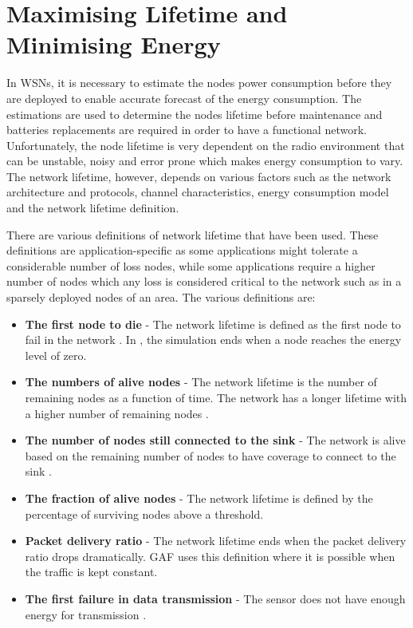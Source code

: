 
\section{Maximising Lifetime and Minimising Energy}
In WSNs, it is necessary to estimate the nodes power consumption before they are deployed to enable accurate forecast of the energy consumption. The estimations are used to determine the nodes lifetime before maintenance and batteries replacements are required in order to have a functional network. Unfortunately, the node lifetime is very dependent on the radio environment that can be unstable, noisy and error prone which makes energy consumption to vary. The network lifetime, however, depends on various factors such as the network architecture and protocols, channel characteristics, energy consumption model and the network lifetime definition. 

There are various definitions of network lifetime that have been used. These definitions are application-specific as some applications might tolerate a considerable number of loss nodes, while some applications require a higher number of nodes which any loss is considered critical to the network such as in a sparsely deployed nodes of an area. The various definitions are:

\begin{itemize}
\item \textbf{The first node to die} - The network lifetime is defined as the first node to fail in the network \cite{maxmin}. In \cite{lifetimedef1}, the simulation ends when a node reaches the energy level of zero.

\item \textbf{The numbers of alive nodes} - The network lifetime is the number of remaining nodes as a function of time. The network has a longer lifetime with a higher number of remaining nodes \cite{lifetimedef2, smecn}.

\item \textbf{The number of nodes still connected to the sink} - The network is alive based on the remaining number of nodes to have coverage to connect to the sink \cite{smecn}.

\item \textbf{The fraction of alive nodes} - The network lifetime is defined by the percentage of surviving nodes above a threshold.

\item \textbf{Packet delivery ratio} - The network lifetime ends when the packet delivery ratio drops dramatically. GAF \cite{gaf} uses this definition where it is possible when the traffic is kept constant.

\item \textbf{The first failure in data transmission} - The sensor does not have enough energy for transmission \cite{maxmin}.
\end{itemize}

